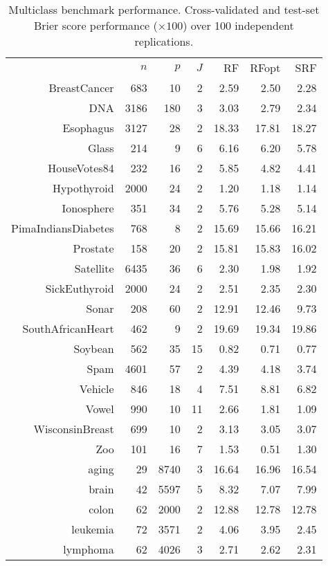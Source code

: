 \documentclass{bmcart}
\def\RFopt{RFopt}
\begin{document}
\begin{backmatter}
\begin{table}[hbt]
\caption{Multiclass benchmark performance.
  Cross-validated and test-set Brier score performance ($\times 100$)
    over 100 independent replications.} 
\centering
\begin{tabular}{rrrrrrr}
  \cline{2-7}
& $n$ & $p$ & $J$ & RF & \RFopt & SRF \\ 
  \cline{2-7}
BreastCancer & 683 & 10 & 2 & 2.59 & 2.50 & 2.28 \\ 
  DNA & 3186 & 180 & 3 & 3.03 & 2.79 & 2.34 \\ 
  Esophagus & 3127 & 28 & 2 & 18.33 & 17.81 & 18.27 \\ 
  Glass & 214 & 9 & 6 & 6.16 & 6.20 & 5.78 \\ 
  HouseVotes84 & 232 & 16 & 2 & 5.85 & 4.82 & 4.41 \\ 
  Hypothyroid & 2000 & 24 & 2 & 1.20 & 1.18 & 1.14 \\ 
  Ionosphere & 351 & 34 & 2 & 5.76 & 5.28 & 5.14 \\ 
  PimaIndiansDiabetes & 768 & 8 & 2 & 15.69 & 15.66 & 16.21 \\ 
  Prostate & 158 & 20 & 2 & 15.81 & 15.83 & 16.02 \\ 
  Satellite & 6435 & 36 & 6 & 2.30 & 1.98 & 1.92 \\ 
  SickEuthyroid & 2000 & 24 & 2 & 2.51 & 2.35 & 2.30 \\ 
  Sonar & 208 & 60 & 2 & 12.91 & 12.46 & 9.73 \\ 
  SouthAfricanHeart & 462 & 9 & 2 & 19.69 & 19.34 & 19.86 \\ 
  Soybean & 562 & 35 & 15 & 0.82 & 0.71 & 0.77 \\ 
  Spam & 4601 & 57 & 2 & 4.39 & 4.18 & 3.74 \\ 
  Vehicle & 846 & 18 & 4 & 7.51 & 8.81 & 6.82 \\ 
  Vowel & 990 & 10 & 11 & 2.66 & 1.81 & 1.09 \\ 
  WisconsinBreast & 699 & 10 & 2 & 3.13 & 3.05 & 3.07 \\ 
  Zoo & 101 & 16 & 7 & 1.53 & 0.51 & 1.30 \\ 
  aging & 29 & 8740 & 3 & 16.64 & 16.96 & 16.54 \\ 
  brain & 42 & 5597 & 5 & 8.32 & 7.07 & 7.99 \\ 
  colon & 62 & 2000 & 2 & 12.88 & 12.78 & 12.78 \\ 
  leukemia & 72 & 3571 & 2 & 4.06 & 3.95 & 2.45 \\ 
  lymphoma & 62 & 4026 & 3 & 2.71 & 2.62 & 2.31 \\ 

\end{tabular}
\end{table}
\end{backmatter}
\end{document}
